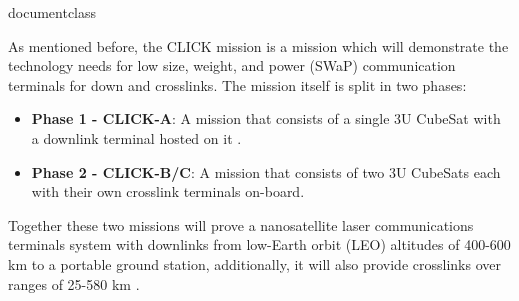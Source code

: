 \csname documentclass
\usepackage[utf8x]{inputenc}
\usepackage{blindtext}
\usepackage{float}
\usepackage{graphicx}
\usepackage{siunitx}
\usepackage{cite}



As mentioned before, the CLICK mission is a mission which will demonstrate the technology needs for low size, weight, and power (SWaP) communication terminals for down and crosslinks. The mission itself is split in two phases:
\begin{itemize}
    \item \textbf{Phase 1 - CLICK-A}: A mission that consists of a single 3U CubeSat with a downlink terminal hosted on it \cite{click_a}.
    \item \textbf{Phase 2 - CLICK-B/C}: A mission that consists of two 3U CubeSats each with their own crosslink terminals on-board.\cite{click_a}
\end{itemize}

Together these two missions will prove a nanosatellite laser communications terminals system with downlinks from low-Earth orbit (LEO) altitudes of 400-600 \unit{\kilo\meter} to a portable ground station, additionally, it will also provide crosslinks over ranges of 25-580 \unit{\kilo \meter} \cite{optical}.

